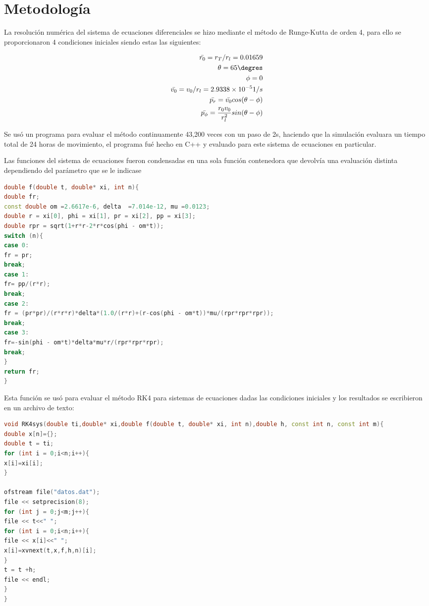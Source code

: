 \documentclass{article}
\begin{document}
\section{Metodología}

La resolución numérica del sistema de ecuaciones diferenciales se hizo mediante el método de Runge-Kutta de orden 4, para ello se proporcionaron 4 condiciones iniciales siendo estas las siguientes:

\begin{align*}
\bar{r_0} = r_T/r_l =0.01659\\
\theta =65\degres\\
\phi =0\\
\bar{v_0}=v_0/r_l =2.9338\times 10^{-5} 1/s\\
\bar{p_r} = \bar{v_0}cos(\theta-\phi)\\
\bar{p_{\phi}}=\frac{r_0v_0}{r^2_l}sin(\theta-\phi)
\end{align*}

Se usó un programa para evaluar el método continuamente 43,200 veces con un paso de 2s, haciendo que la simulación evaluara un tiempo total de 24 horas de movimiento, el programa fué hecho en C++ y evaluado para este sistema de ecuaciones en particular.

Las funciones del sistema de ecuaciones fueron condensadas en una sola función contenedora que devolvía una evaluación distinta dependiendo del parámetro que se le indicase
\pagebreak

\begin{lstlisting}[language=C++,caption=código de la función condensadora del sistema de ecuaciones]
double f(double t, double* xi, int n){
double fr;
const double om =2.6617e-6, delta  =7.014e-12, mu =0.0123;
double r = xi[0], phi = xi[1], pr = xi[2], pp = xi[3];
double rpr = sqrt(1+r*r-2*r*cos(phi - om*t));
switch (n){
case 0:
fr = pr;
break;
case 1:
fr= pp/(r*r);
break;
case 2:
fr = (pr*pr)/(r*r*r)*delta*(1.0/(r*r)+(r-cos(phi - om*t))*mu/(rpr*rpr*rpr));
break;
case 3:
fr=-sin(phi - om*t)*delta*mu*r/(rpr*rpr*rpr);
break;
}
return fr;
}
\end{lstlisting}

Esta función se usó para evaluar el método RK4 para sistemas de ecuaciones dadas las condiciones iniciales y los resultados se escribieron en un archivo de texto:

\begin{lstlisting}[language=C++,caption=Aplicación del método RK4 y escritura en un archivo de texto]
void RK4sys(double ti,double* xi,double f(double t, double* xi, int n),double h, const int n, const int m){
double x[n]={};
double t = ti;
for (int i = 0;i<n;i++){
x[i]=xi[i];
}

ofstream file("datos.dat");
file << setprecision(8);
for (int j = 0;j<m;j++){
file << t<<" "; 
for (int i = 0;i<n;i++){ 
file << x[i]<<" ";
x[i]=xvnext(t,x,f,h,n)[i];     
} 
t = t +h;
file << endl;
}
}
\end{lstlisting}
\end{document}
